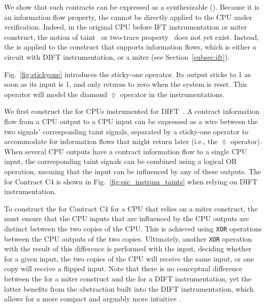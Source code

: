 
We show that such contracts can be expressed as a synthesizable \pici (\PICI).
Because it is an information flow property, the \PICI cannot be directly applied to the CPU under verification.
Indeed, in the original CPU before IFT instrumentation or miter construct, the notion of taint~\cite{solt2022cellift,ceesay2024mucfi} or two-trace property~\cite{wang2023specification,dinesh2024conjunct,dinesh2024conjunct,tan2025contractshadowlogic} does not yet exist.
Instead, the \PICI is applied to the construct that supports information flows, which is either a circuit with DIFT instrumentation, or a miter (see Section~\ref{subsec:ift}).

Fig.~\ref{fig:stickyone} introduces the sticky-one operator.
Its output sticks to 1 as soon as its input is 1, and only returns to zero when the system is reset.
This operator will model the diamond $\lozenge$ operator in the instrumentations.

We first construct the \PICI for CPUs instrumented for DIFT~\cite{tiwari2009complete,solt2022cellift}.
A contract information flow from a CPU output to a CPU input can be expressed as a wire between the two signals' corresponding taint signals, separated by a sticky-one operator to accommodate for information flows that might return later (i.e., the $\lozenge$ operator).
When several CPU outputs have a contract information flow to a single CPU input, the corresponding taint signals can be combined using a logical OR operation, meaning that the input can be influenced by any of these outputs.
The \PICI for Contract C4 is shown in Fig.~\ref{fig:pic_instrum_taints} when relying on DIFT instrumentation.

To construct the \PICI for Contract C4 for a CPU that relies on a miter construct, the \PICI must ensure that the CPU inputs that are influenced by the CPU outputs are distinct between the two copies of the CPU.
This is achieved using \texttt{XOR} operations between the CPU outputs of the two copies.
Ultimately, another \texttt{XOR} operation with the result of this difference is performed with the input, deciding whether for a given input, the two copies of the CPU will receive the same input, or one copy will receive a flipped input.
Note that there is no conceptual difference between the \PICI for a miter construct and the \PICI for a DIFT instrumentation, yet the latter benefits from the abstraction built into the DIFT instrumentation, which allows for a more compact and arguably more intuitive \PICI.


